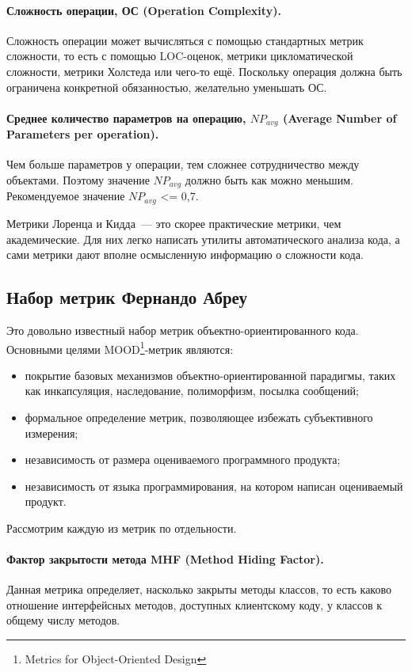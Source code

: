 \documentclass{../../text-style}
\begin{document}
\paragraph{Сложность операции, ОС (Operation Complexity).} Сложность операции может вычисляться с помощью стандартных метрик сложности, то есть с помощью LOC-оценок, метрики цикломатической сложности, метрики Холстеда или чего-то ещё. Поскольку операция должна быть ограничена конкретной обязанностью, желательно уменьшать ОС.

\paragraph{Среднее количество параметров на операцию, $NP_{avg}$ (Average Number of Parameters per operation).} Чем больше параметров у операции, тем сложнее сотрудничество между объектами. Поэтому значение $NP_{avg}$ должно быть как можно меньшим. Рекомендуемое значение $NP_{avg}$ <= 0,7.

Метрики Лоренца и Кидда~--- это скорее практические метрики, чем академические. Для них легко написать утилиты автоматического анализа кода, а сами метрики дают вполне осмысленную информацию о сложности кода.

\subsection{Набор метрик Фернандо Абреу}

Это довольно известный набор метрик объектно-ориентированного кода. Основными целями MOOD\footnote{Metrics for Object-Oriented Design}-метрик являются:

\begin{itemize}
    \item покрытие базовых механизмов объектно-ориентированной парадигмы, таких как инкапсуляция, наследование, полиморфизм, посылка сообщений;
    \item формальное определение метрик, позволяющее избежать субъективного измерения;
    \item независимость от размера оцениваемого программного продукта;
    \item независимость от языка программирования, на котором написан оцениваемый продукт.
\end{itemize}

Рассмотрим каждую из метрик по отдельности.

\paragraph{Фактор закрытости метода MHF (Method Hiding Factor).} Данная метрика определяет, насколько закрыты методы классов, то есть каково отношение интерфейсных методов, доступных клиентскому коду, у классов к общему числу методов.
\end{document}
